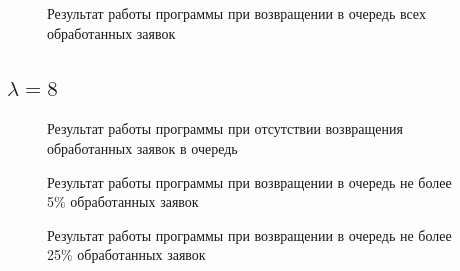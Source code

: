 \documentclass[14pt, a4paper]{extarticle}
\begin{document}
\begin{figure}[H]
\caption{Результат работы программы при возвращении в очередь всех обработанных заявок}
\label{fig:1_100}
\end{figure}

\subsection{$\lambda = 8$}
\begin{figure}[H]
\caption{Результат работы программы при отсутствии возвращения обработанных заявок в очередь}
\label{fig:8_0}
\end{figure}

\begin{figure}[H]
\caption{Результат работы программы при возвращении в очередь не более 5\% обработанных заявок}
\label{fig:8_5}
\end{figure}

\begin{figure}[H]
\caption{Результат работы программы при возвращении в очередь не более 25\% обработанных заявок}
\label{fig:8_25}
\end{figure}
\end{document}

